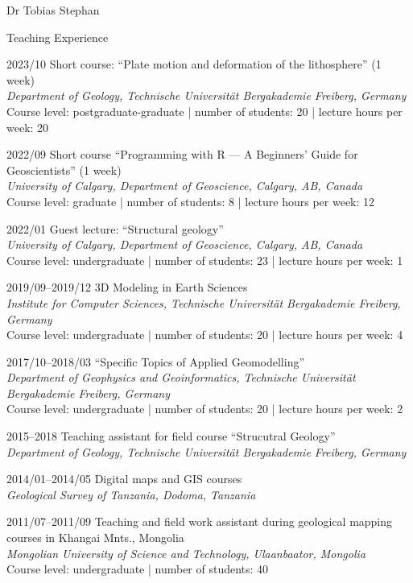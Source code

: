 \documentclass[10pt, paper=letter]{scrartcl} %
\begin{document}
\begin{cv}{Dr Tobias Stephan}
\begin{cvlist}{Teaching Experience}
    \item[2023/10] Short course: \enquote{Plate motion and deformation of the lithosphere} (1 week)\\ 
        \textit{Department of Geology, Technische Universit\"at Bergakademie Freiberg, Germany} 
        Course level: postgraduate-graduate | number of students: 20 | lecture hours per week: 20 
    \item[2022/09] Short course \enquote{Programming with R --- A Beginners’ Guide for Geoscientists} (1 week)\\
        \textit{University of Calgary, Department of Geoscience, Calgary, AB, Canada}\\
        Course level: graduate | number of students: 8 | lecture hours per week: 12 
    \item[2022/01] Guest lecture: \enquote{Structural geology}\\
        \textit{University of Calgary, Department of Geoscience, Calgary, AB, Canada}\\
        Course level: undergraduate | number of students: 23 | lecture hours per week: 1 
    \item[2019/09--2019/12] 3D Modeling in Earth Sciences\\
        \textit{Institute for Computer Sciences, Technische Universit\"at Bergakademie Freiberg, Germany}\\
        Course level: undergraduate | number of students: 20 | lecture hours per week: 4 
    \item[2017/10--2018/03] \enquote{Specific Topics of Applied Geomodelling}\\
        \textit{Department of Geophysics and Geoinformatics, Technische Universit\"at Bergakademie Freiberg, Germany}\\
        Course level: undergraduate | number of students: 20 | lecture hours per week: 2 
    \item[2015--2018] Teaching assistant for field course \enquote{Strucutral Geology}\\
        \textit{Department of Geology, Technische Universit\"at Bergakademie Freiberg, Germany}
    \item[2014/01--2014/05] Digital maps and GIS courses\\
        \textit{Geological Survey of Tanzania, Dodoma, Tanzania}
    \item[2011/07--2011/09] Teaching and field work assistant during geological mapping courses in Khangai Mnts., Mongolia\\
        \textit{Mongolian University of Science and Technology, Ulaanbaator, Mongolia}\\
         Course level: undergraduate | number of students: 40  
\end{cvlist}


\end{cv}
\end{document}
